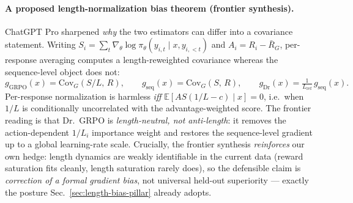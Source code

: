 \documentclass{article}
\begin{document}
\paragraph{A proposed length-normalization bias theorem (frontier synthesis).}
ChatGPT Pro sharpened \emph{why} the two estimators can differ into a covariance
statement. Writing $S_i=\sum_{t}\nabla_\theta\log\pi_\theta(y_{i,t}\mid x,y_{i,<t})$
and $A_i=R_i-\bar R_G$, per-response averaging computes a length-reweighted
covariance whereas the sequence-level object does not:
\begin{equation}
g_{\mathrm{GRPO}}(x)=\mathrm{Cov}_G\!\left(S/L,\,R\right),
\qquad
g_{\mathrm{seq}}(x)=\mathrm{Cov}_G\!\left(S,\,R\right),
\qquad
g_{\mathrm{Dr}}(x)=\tfrac{1}{L_{\mathrm{ref}}}\,g_{\mathrm{seq}}(x).
\end{equation}
Per-response normalization is harmless \emph{iff}
$\mathbb{E}\!\left[AS\left(1/L-c\right)\mid x\right]=0$, i.e.\ when $1/L$ is
conditionally uncorrelated with the advantage-weighted score. The frontier
reading is that Dr.~GRPO is \emph{length-neutral, not anti-length}: it removes
the action-dependent $1/L_i$ importance weight and restores the sequence-level
gradient up to a global learning-rate scale. Crucially, the frontier synthesis
\emph{reinforces} our own hedge: length dynamics are weakly identifiable in the
current data (reward saturation fits cleanly, length saturation rarely does), so
the defensible claim is \emph{correction of a formal gradient bias}, not
universal held-out superiority --- exactly the posture Sec.~\ref{sec:length-bias-pillar}
already adopts.
\end{document}
